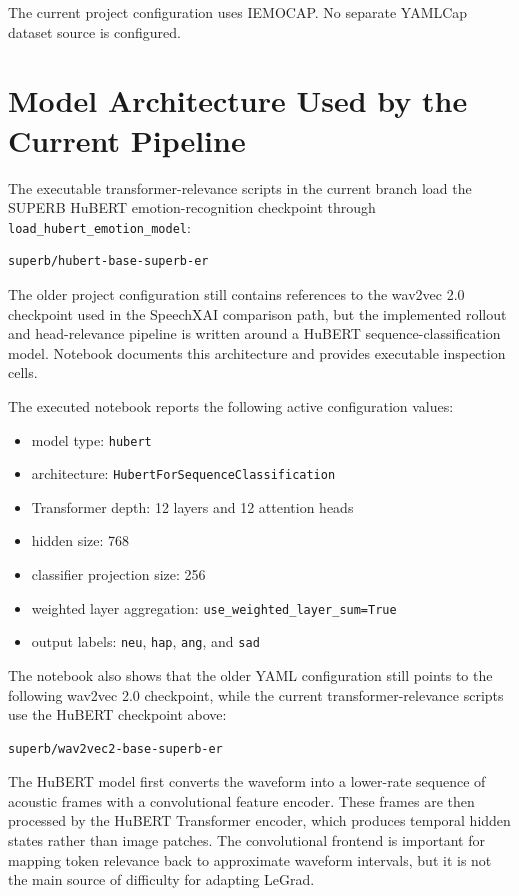 \documentclass[11pt]{article}
\begin{document}
The current project configuration uses IEMOCAP. No separate YAMLCap dataset source is configured.

\section{Model Architecture Used by the Current Pipeline}

The executable transformer-relevance scripts in the current branch load the
SUPERB HuBERT emotion-recognition checkpoint through
\texttt{load\_hubert\_emotion\_model}:

\begin{verbatim}
superb/hubert-base-superb-er
\end{verbatim}

The older project configuration still contains references to the wav2vec 2.0
checkpoint used in the SpeechXAI comparison path, but the implemented rollout
and head-relevance pipeline is written around a HuBERT sequence-classification
model. Notebook  documents this architecture
and provides executable inspection cells.

The executed notebook reports the following active configuration values:

\begin{itemize}
  \item model type: \texttt{hubert}
  \item architecture: \texttt{HubertForSequenceClassification}
  \item Transformer depth: 12 layers and 12 attention heads
  \item hidden size: 768
  \item classifier projection size: 256
  \item weighted layer aggregation: \texttt{use\_weighted\_layer\_sum=True}
  \item output labels: \texttt{neu}, \texttt{hap}, \texttt{ang}, and \texttt{sad}
\end{itemize}

The notebook also shows that the older YAML configuration still points to the
following wav2vec 2.0 checkpoint, while the current transformer-relevance
scripts use the HuBERT checkpoint above:

\begin{verbatim}
superb/wav2vec2-base-superb-er
\end{verbatim}

The HuBERT model first converts the waveform into a lower-rate sequence of
acoustic frames with a convolutional feature encoder. These frames are then
processed by the HuBERT Transformer encoder, which produces temporal hidden
states rather than image patches. The convolutional frontend is important for
mapping token relevance back to approximate waveform intervals, but it is not
the main source of difficulty for adapting LeGrad.
\end{document}
